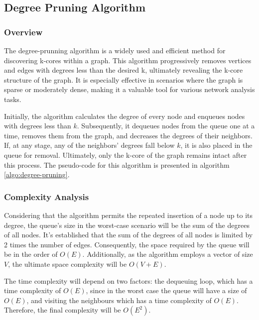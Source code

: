 \label{Algorithms}

\subsection{Degree Pruning Algorithm}

\subsubsection{Overview}

The degree-prunning algorithm is a widely used and efficient method for discovering k-cores within a graph. This algorithm progressively removes vertices and edges with degrees less than the desired k, ultimately revealing the k-core structure of the graph. It is especially effective in scenarios where the graph is sparse or moderately dense, making it a valuable tool for various network analysis tasks. 

Initially, the algorithm calculates the degree of every node and enqueues nodes with degrees less than $k$. Subsequently, it dequeues nodes from the queue one at a time, removes them from the graph, and decreases the degrees of their neighbors. If, at any stage, any of the neighbors' degrees fall below $k$, it is also placed in the queue for removal. Ultimately, only the k-core of the graph remains intact after this process. The pseudo-code for this algorithm is presented in algorithm \ref{algo:degree-pruning}.



\subsubsection{Complexity Analysis}

Considering that the algorithm permits the repeated insertion of a node up to its degree, the queue's size in the worst-case scenario will be the sum of the degrees of all nodes. It's established that the sum of the degrees of all nodes is limited by 2 times the number of edges. Consequently, the space required by the queue will be in the order of $O(E)$. Additionally, as the algorithm employs a vector of size $V$, the ultimate space complexity will be $O(V + E)$.

The time complexity will depend on two factors: the dequeuing loop, which has a time complexity of $O(E)$, since in the worst case the queue will have a size of $O(E)$, and visiting the neighbours which has a time complexity of $O(E)$. Therefore, the final complexity will be $O(E^2)$.

